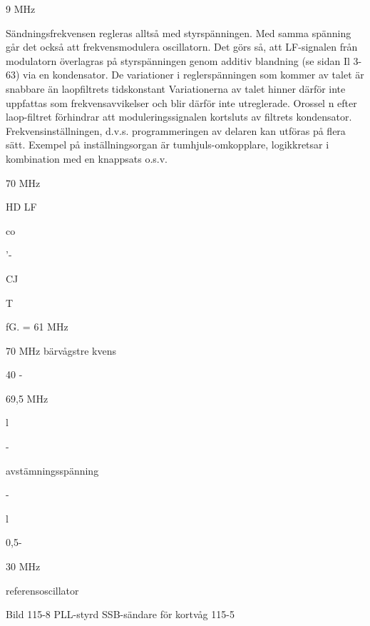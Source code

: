 9 MHz

Sändningsfrekvensen regleras alltså med
styrspänningen. Med samma spänning går
det också att frekvensmodulera oscillatorn.
Det görs så, att LF-signalen från modulatorn
överlagras på styrspänningen genom additiv blandning (se sidan Il 3-63) via en kondensator. De variationer i reglerspänningen
som kommer av talet är snabbare än laopfiltrets tidskonstant Variationerna av talet
hinner därför inte uppfattas som frekvensavvikelser och blir därför inte utreglerade.
Orossel n efter laop-filtret förhindrar att moduleringssignalen kortsluts av filtrets kondensator.
Frekvensinställningen, d.v.s. programmeringen av delaren kan utföras på flera
sätt. Exempel på inställningsorgan är
tumhjuls-omkopplare, logikkretsar i kombination med en knappsats o.s.v.

70 MHz

HD
LF


co

'-

CJ

T

fG. = 61 MHz

70 MHz
bärvågstre kvens

40 -

69,5 MHz

l

-

avstämningsspänning

-

l

0,5-

30 MHz

referensoscillator

Bild 115-8 PLL-styrd SSB-sändare för kortvåg
115-5

